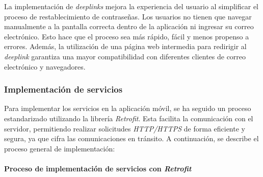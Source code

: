 La implementación de \textit{deeplinks} mejora la experiencia del usuario al simplificar el proceso de restablecimiento de contraseñas. Los usuarios no tienen que navegar manualmente a la pantalla correcta dentro de la aplicación ni ingresar su correo electrónico. Esto hace que el proceso sea más rápido, fácil y menos propenso a errores. Además, la utilización de una página web intermedia para redirigir al \textit{deeplink} garantiza una mayor compatibilidad con diferentes clientes de correo electrónico y navegadores.




\subsubsection{Implementación de servicios}

Para implementar los servicios en la aplicación móvil, se ha seguido un proceso estandarizado utilizando la librería \textit{Retrofit}. Esta facilita la comunicación con el servidor, permitiendo realizar solicitudes \textit{HTTP/HTTPS} de forma eficiente y segura, ya que cifra las comunicaciones en tránsito. A continuación, se describe el proceso general de implementación:

\paragraph{Proceso de implementación de servicios con \textit{Retrofit}}

